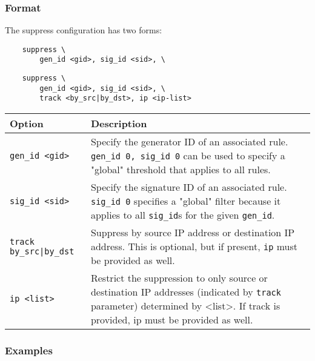\documentclass[english]{report}
\begin{document}
\subsubsection{Format}

The suppress configuration has two forms:

\begin{verbatim}
    suppress \
        gen_id <gid>, sig_id <sid>, \
\end{verbatim}

\begin{verbatim}
    suppress \
        gen_id <gid>, sig_id <sid>, \
        track <by_src|by_dst>, ip <ip-list>
\end{verbatim}

\begin{table}[h]
\begin{center}
\begin{tabular}{| l | p{4.5in} |}

\hline
\textbf{Option} & \textbf{Description}\\
\hline

\hline
\texttt{gen\_id <gid>} &

Specify the generator ID of an associated rule.  \texttt{gen\_id 0, sig\_id 0}
can be used to specify a "global" threshold that applies to all rules.\\

\hline \texttt{sig\_id <sid>} &

Specify the signature ID of an associated rule.  \texttt{sig\_id 0} specifies a
"global" filter because it applies to all \texttt{sig\_id}s for the given
\texttt{gen\_id}.\\

\hline
\texttt{track by\_src|by\_dst} &

Suppress by source IP address or destination IP address.  This is optional, but
if present, \texttt{ip} must be provided as well.\\

\hline
\texttt{ip <list>} &

Restrict the suppression to only source or destination IP addresses (indicated
by \texttt{track} parameter) determined by <list>.  If track is provided, ip
must be provided as well.\\

\hline
\end{tabular}
\end{center}
\end{table}

\subsubsection{Examples}
\end{document}
